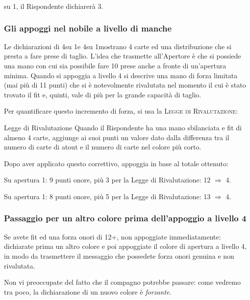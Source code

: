 \documentclass[../corsofiori.tex]{subfiles}
\begin{document}

su 1\Cl, il Rispondente dichiarerà 3\Cl.

\subsubsection{Gli appoggi nel nobile a livello di manche}
Le dichiarazioni di 4\He su 1\He e 4\Sp su 1\Sp mostrano 4 carte ed una distribuzione che si presta a fare prese di
taglio. L'idea che trasmette all'Apertore è che si possiede una mano con cui sia possibile fare 10 prese anche a fronte
di un'apertura minima. Quando si appoggia a livello 4 si descrive una mano di forza limitata (mai più di 11 punti) che
si è notevolmente rivalutata nel momento il cui è stato trovato il fit e, quinti, vale di più per la grande capacità di
taglio.

Per quantificare questo incremento di forza, si usa la \textsc{Legge di Rivalutazione}:

\begin{regola}{Legge di Rivalutazione}
    Quando il Rispondente ha una mano sbilanciata e fit di almeno 4 carte, aggiunge ai suoi punti un valore dato dalla
    differenza tra il numero di carte di atout e il numero di carte nel colore più corto.
\end{regola}

Dopo aver applicato questo correttivo, appoggia in base al totale ottenuto:

\smallskip
{}

        Su apertura 1\He: 9 punti onore, più 3 per la Legge di Rivalutazione: 12 $\Rightarrow$ 4\He.

        \smallskip
{}

Su apertura 1\Sp: 8 punti onore, più 5 per la Legge di Rivalutazione: 13 $\Rightarrow$ 4\Sp.

\subsubsection{Passaggio per un altro colore prima dell'appoggio a livello 4}
    Se avete fit ed una forza onori di 12+, non appoggiate immediatamente: dichiarate prima un altro colore e poi
    appoggiate il colore di apertura a livello 4, in modo da trasmettere il messaggio che possedete forza onori genuina
    e non rivalutata.

    Non vi preoccupate del fatto che il compagno potrebbe passare: come vedremo tra poco, la dichiarazione di un nuovo
    colore è \emph{forzante}.
    \smallskip
\end{document}

